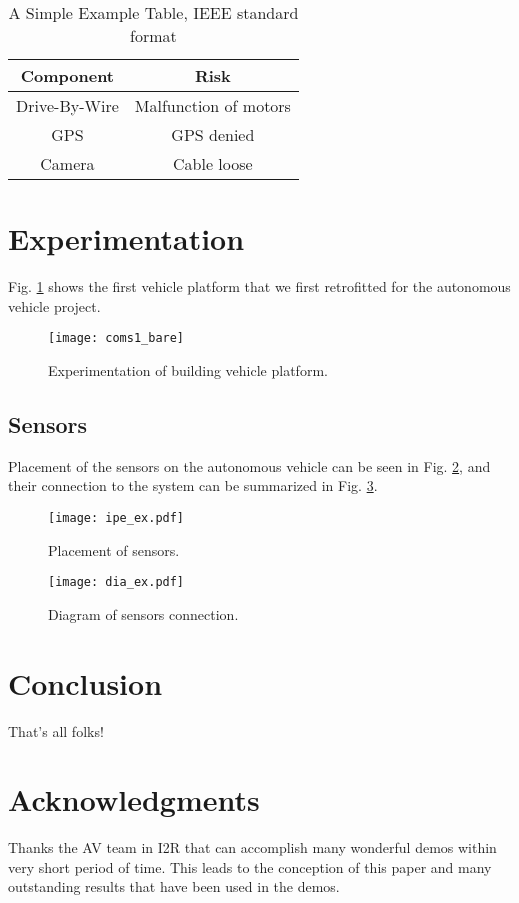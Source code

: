 \documentclass[conference]{IEEEtran}
\begin{document}
\begin{table}[!t]
\renewcommand{\arraystretch}{1.3}
\caption{A Simple Example Table, IEEE standard format}
\label{table_example}
\centering
\begin{tabular}{c||c}
\hline\bfseries Component & \bfseries Risk\\
\hline
\hline Drive-By-Wire & Malfunction of motors\\
\hline
\hline GPS & GPS denied\\
\hline
\hline Camera & Cable loose\\
\hline
\end{tabular}
\end{table}

\section{Experimentation}\label{experimentation}

Fig. \ref{coms1_bare} shows the first vehicle platform that we first
retrofitted for the autonomous vehicle project.

\begin{figure}[!t]
\centering
\texttt{[image: coms1\_bare]}
\caption{Experimentation of building vehicle platform.}
\label{coms1_bare}
\end{figure}

\subsection{Sensors}\label{sensors}

Placement of the sensors on the autonomous vehicle can be seen in Fig.
\ref{ipe_ex}, and their connection to the system can be summarized in
Fig. \ref{dia_ex}.

\begin{figure}[!t]
\centering
\texttt{[image: ipe\_ex.pdf]}
\caption{Placement of sensors.}
\label{ipe_ex}
\end{figure}

\begin{figure}[!t]
\centering
\texttt{[image: dia\_ex.pdf]}
\caption{Diagram of sensors connection.}
\label{dia_ex}
\end{figure}

\section{Conclusion}\label{conclusion}

That's all folks!

\section*{Acknowledgments}\label{acknowledgments}

Thanks the AV team in I2R that can accomplish many wonderful demos
within very short period of time. This leads to the conception of this
paper and many outstanding results that have been used in the demos.

                                    \renewcommand\refname{References}
                        

    
\end{document}
